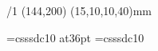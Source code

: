 \chyph  %





\margins/1 (144,200) (15,10,10,40)mm

\typosize[10/15]

\def\pagenumbers{\footline{\hss\tenrm\folio\hss}}

\def\picdir {/home/petr/Google Drive/DATA/CislicovaTechnika/Obrazky/}

\font\nadpis=csssdc10  at36pt
\font\telo=csssdc10 

\def\atd {...}
